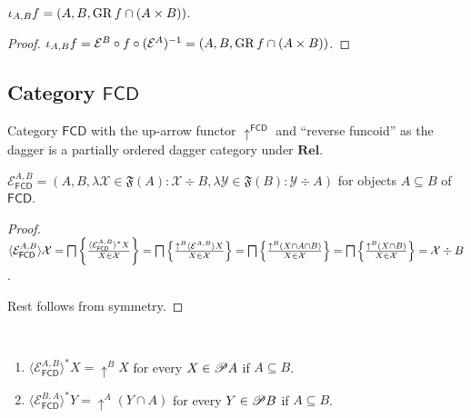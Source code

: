 \begin{prop}
  $\iota_{A, B} f = (A , B , \operatorname{GR} f \cap (A \times B))$.
\end{prop}

\begin{proof}
  $\iota_{A, B} f = \mathcal{E}^{B} \circ f \circ (\mathcal{E}^{A})^{-1} = (A , B , \operatorname{GR} f \cap (A \times B))$.
\end{proof}

\subsection{\texorpdfstring{Category $\mathsf{FCD}$}{Category FCD}}

Category $\mathsf{FCD}$ with the up-arrow functor
$\uparrow^{\mathsf{FCD}}$ and ``reverse funcoid'' as the dagger is a
partially ordered dagger category under $\mathbf{Rel}$.

\begin{prop}
  $\mathcal{E}_{\mathsf{FCD}}^{A,B} = (A , B , \lambda \mathcal{X}
  \in \mathfrak{F} (A) : \mathcal{X} \div B , \lambda \mathcal{Y} \in
  \mathfrak{F} (B) : \mathcal{Y} \div A)$ for objects $A \subseteq B$ of
  $\mathsf{FCD}$.
\end{prop}

\begin{proof}
  $\langle \mathcal{E}_{\mathsf{FCD}}^{A,B} \rangle \mathcal{X} =
  \bigsqcap \left\{ \frac{ \langle \mathcal{E}_{\mathsf{FCD}}^{A,B}
  \rangle^{\ast} X }{ X \in \mathcal{X} }\right\} =
  \bigsqcap \left\{ \frac{ \uparrow^B  \langle \mathcal{E}^{A,B} \rangle X
  }{ X \in \mathcal{X} }\right\} = \bigsqcap \left\{ \frac{
  \uparrow^B  (X \cap A \cap B) }{ X \in \mathcal{X}
  }\right\} = \bigsqcap \left\{ \frac{ \uparrow^B  (X \cap B) }{
  X \in \mathcal{X} }\right\} = \mathcal{X} \div B$.
  
  Rest follows from symmetry.
\end{proof}

\begin{prop}
  ~
  \begin{enumerate}
    \item $\langle \mathcal{E}_{\mathsf{FCD}}^{A,B} \rangle^{\ast} X
    = \uparrow^B X$ for every $X \in \mathscr{P} A$ if $A \subseteq B$.
    
    \item $\langle \mathcal{E}_{\mathsf{FCD}}^{B,A} \rangle^{\ast}
    Y = \uparrow^A (Y \cap A)$ for every $Y \in \mathscr{P} B$ if $A \subseteq
    B$.
  \end{enumerate}
\end{prop}

